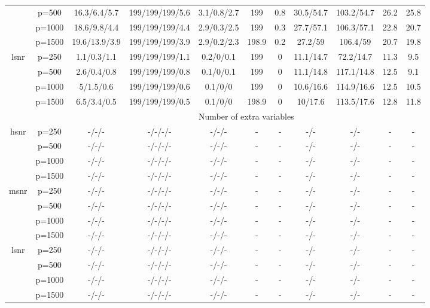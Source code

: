 \begin{table}[ht]
{\begin{tabular}{|c|c|ccccccccc|}
   & p=500 & 16.3/6.4/5.7 & 199/199/199/5.6 & 3.1/0.8/2.7 & 199 & 0.8 & 30.5/54.7 & 103.2/54.7 & 26.2 & 25.8 \\ 
   & p=1000 & 18.6/9.8/4.4 & 199/199/199/4.4 & 2.9/0.3/2.5 & 199 & 0.3 & 27.7/57.1 & 106.3/57.1 & 22.8 & 20.7 \\ 
   & p=1500 & 19.6/13.9/3.9 & 199/199/199/3.9 & 2.9/0.2/2.3 & 198.9 & 0.2 & 27.2/59 & 106.4/59 & 20.7 & 19.8 \\ 
  \midrule\multirow{4}[2]{*}{lsnr} & p=250 & 1.1/0.3/1.1 & 199/199/199/1.1 & 0.2/0/0.1 & 199 & 0 & 11.1/14.7 & 72.2/14.7 & 11.3 & 9.5 \\ 
   & p=500 & 2.6/0.4/0.8 & 199/199/199/0.8 & 0.1/0/0.1 & 199 & 0 & 11.1/14.8 & 117.1/14.8 & 12.5 & 9.1 \\ 
   & p=1000 & 5/1.5/0.6 & 199/199/199/0.6 & 0.1/0/0 & 199 & 0 & 10.6/16.6 & 114.9/16.6 & 12.5 & 10.5 \\ 
   & p=1500 & 6.5/3.4/0.5 & 199/199/199/0.5 & 0.1/0/0 & 198.9 & 0 & 10/17.6 & 113.5/17.6 & 12.8 & 11.8 \\ 
   \midrule 
 \multicolumn{1}{|c}{} &       & \multicolumn{9}{c|}{Number of extra variables} \\
\midrule\multirow{4}[2]{*}{hsnr} & p=250 & -/-/- & -/-/-/- & -/-/- & - & - & -/- & -/- & - & - \\ 
   & p=500 & -/-/- & -/-/-/- & -/-/- & - & - & -/- & -/- & - & - \\ 
   & p=1000 & -/-/- & -/-/-/- & -/-/- & - & - & -/- & -/- & - & - \\ 
   & p=1500 & -/-/- & -/-/-/- & -/-/- & - & - & -/- & -/- & - & - \\ 
  \midrule\multirow{4}[2]{*}{msnr} & p=250 & -/-/- & -/-/-/- & -/-/- & - & - & -/- & -/- & - & - \\ 
   & p=500 & -/-/- & -/-/-/- & -/-/- & - & - & -/- & -/- & - & - \\ 
   & p=1000 & -/-/- & -/-/-/- & -/-/- & - & - & -/- & -/- & - & - \\ 
   & p=1500 & -/-/- & -/-/-/- & -/-/- & - & - & -/- & -/- & - & - \\ 
  \midrule\multirow{4}[2]{*}{lsnr} & p=250 & -/-/- & -/-/-/- & -/-/- & - & - & -/- & -/- & - & - \\ 
   & p=500 & -/-/- & -/-/-/- & -/-/- & - & - & -/- & -/- & - & - \\ 
   & p=1000 & -/-/- & -/-/-/- & -/-/- & - & - & -/- & -/- & - & - \\ 
   & p=1500 & -/-/- & -/-/-/- & -/-/- & - & - & -/- & -/- & - & - \\ 
   \bottomrule 
\end{tabular}
}
\end{table}
